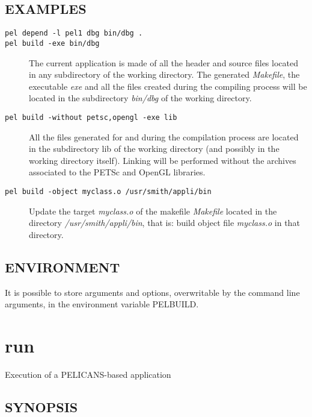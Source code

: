\documentclass{article}
\begin{document}
\subsection*{EXAMPLES\label{build_EXAMPLES}}
\begin{description}

\item[\texttt{pel depend -l pel1 dbg bin/dbg .}] \mbox{}
\item[\texttt{pel build -exe bin/dbg}] \mbox{}

The current application is made of all the header and source files
located in any subdirectory of the working directory. The
generated \emph{Makefile}, the executable \emph{exe} and all the files
created during the compiling process will be located in the
subdirectory \emph{bin/dbg} of the working directory.


\item[\texttt{pel build -without petsc,opengl -exe lib}] \mbox{}

All the files generated for and during the compilation process
are located in the subdirectory lib of the working directory
(and possibly in the working directory itself).
Linking will be performed without the archives associated
to the PETSc and OpenGL libraries.


\item[\texttt{pel build -object myclass.o /usr/smith/appli/bin}] \mbox{}

Update the target \emph{myclass.o} of the makefile \emph{Makefile}
located in the directory \emph{/usr/smith/appli/bin}, that
is: build object file \emph{myclass.o} in that directory.

\end{description}
\subsection*{ENVIRONMENT\label{build_ENVIRONMENT}}


It is possible to store arguments and options, overwritable by the command
line arguments, in the environment variable PELBUILD.

\clearpage
\section{run\label{run}}


Execution of a PELICANS-based application

\subsection*{SYNOPSIS\label{run_SYNOPSIS}}
\end{document}
